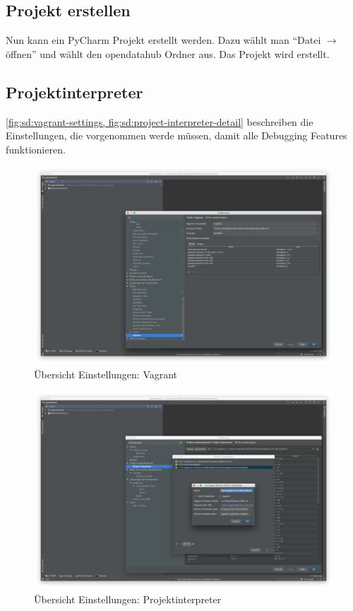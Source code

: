 \subsection{Projekt erstellen}
Nun kann ein PyCharm Projekt erstellt werden. Dazu wählt man ``Datei $\to$ öffnen'' und wählt den opendatahub Ordner aus. Das Projekt wird erstellt. 

\subsection{Projektinterpreter}
\cref{fig:sd:vagrant-settings, fig:sd:project-interpreter-detail} beschreiben die Einstellungen, die vorgenommen werde müssen, damit alle Debugging Features funktionieren.
\begin{figure}[H]
	\centering
	\includegraphics[width=0.8\linewidth]{fig/vagrant_settings}
	\caption{Übersicht Einstellungen: Vagrant}
	\label{fig:sd:vagrant-settings}
\end{figure}
\begin{figure}[H]
	\centering
	\includegraphics[width=0.8\linewidth]{fig/project_interpreter_detail}
	\caption{Übersicht Einstellungen: Projektinterpreter}
	\label{fig:sd:project-interpreter-detail}
\end{figure}


